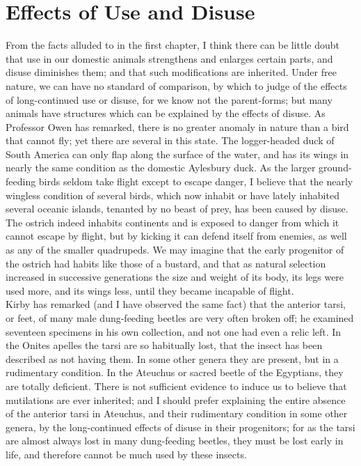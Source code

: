 \section{Effects of Use and Disuse}
\indent From the facts alluded to in the first chapter, I think there can be little doubt that use in our domestic animals strengthens and enlarges certain parts, and disuse diminishes them; and that such modifications are inherited. Under free nature, we can have no standard of comparison, by which to judge of the effects of long-continued use or disuse, for we know not the parent-forms; but many animals have structures which can be explained by the effects of disuse. As Professor Owen has remarked, there is no greater anomaly in nature than a bird that cannot fly; yet there are several in this state. The logger-headed duck of South America can only flap along the surface of the water, and has its wings in nearly the same condition as the domestic Aylesbury duck. As the larger ground-feeding birds seldom take flight except to escape danger, I believe that the nearly wingless condition of several birds, which now inhabit or have lately inhabited several oceanic islands, tenanted by no beast of prey, has been caused by disuse. The ostrich indeed inhabits continents and is exposed to danger from which it cannot escape by flight, but by kicking it can defend itself from enemies, as well as any of the smaller quadrupeds. We may imagine that the early progenitor of the ostrich had habits like those of a bustard, and that as natural selection increased in successive generations the size and weight of its body, its legs were used more, and its wings less, until they became incapable of flight.\\
\indent Kirby has remarked (and I have observed the same fact) that the anterior tarsi, or feet, of many male dung-feeding beetles are very often broken off; he examined seventeen specimens in his own collection, and not one had even a relic left. In the Onites apelles the tarsi are so habitually lost, that the insect has been described as not having them. In some other genera they are present, but in a rudimentary condition. In the Ateuchus or sacred beetle of the Egyptians, they are totally deficient. There is not sufficient evidence to induce us to believe that mutilations are ever inherited; and I should prefer explaining the entire absence of the anterior tarsi in Ateuchus, and their rudimentary condition in some other genera, by the long-continued effects of disuse in their progenitors; for as the tarsi are almost always lost in many dung-feeding beetles, they must be lost early in life, and therefore cannot be much used by these insects.\\
